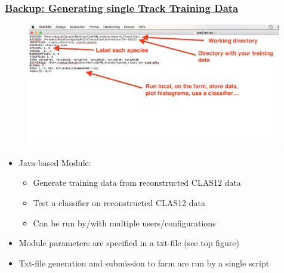 \documentclass[xcolor=table, xcolor=dvipsnames]{beamer}
\begin{document}
\begin{frame}
  \frametitle{\hyperlink{bup}{Backup: Generating single Track Training Data}}
  \label{readConf}
 \scriptsize
  
  \begin{figure}
    \includegraphics[width=0.99\textwidth]{testConf2.png}
  \end{figure}
  
  \begin{itemize}
    \item Java-based Module:
    \begin{itemize}
      \scriptsize
      \item Generate training data from reconstructed CLAS12 data
      \item Test a classifier on reconstructed CLAS12 data
      \item Can be run by/with multiple users/configurations
    \end{itemize}
    \item Module parameters are specified in a txt-file (see top figure)
    \item Txt-file generation and submission to farm are run by a single script
  \end{itemize}
\end{frame}
\end{document}
